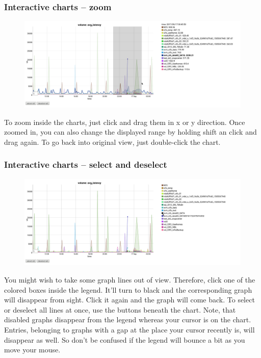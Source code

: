 \documentclass[8pt]{beamer}
\begin{document}
\begin{frame}
\frametitle{Interactive charts -- zoom} 
\begin{figure}
	\includegraphics[width=\textwidth]{../images/PicDat_zoomVertical.png}
\end{figure}

To zoom inside the charts, just click and drag them in x or y direction. Once zoomed in, you can also change the displayed range by holding shift an click and drag again. To go back into original view, just double-click the chart.
\end{frame}

\begin{frame}
\frametitle{Interactive charts -- select and deselect} 
\begin{figure}
	\includegraphics[width=\textwidth]{../images/PicDat_deselect.png}
\end{figure}

You might wish to take some graph lines out of view. Therefore, click one of the colored boxes inside the legend. It'll turn to black and the corresponding graph will disappear from sight. Click it again and the graph will come back. To select or deselect all lines at once, use the buttons beneath the chart.
Note, that disabled graphs disappear from the legend whereas your cursor is on the chart. Entries, belonging to graphs with a gap at the place your cursor recently is, will disappear as well. So don't be confused if the legend will bounce a bit as you move your mouse.
\end{frame}
\end{document}
